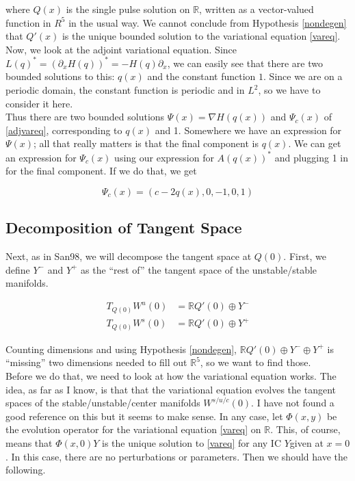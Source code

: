 \documentclass[12pt]{article}
\def\R{{\mathbb R}}
\begin{document}
where $Q(x)$ is the single pulse solution on $\R$, written as a vector-valued function in $R^5$ in the usual way. We cannot conclude from Hypothesis \ref{nondegen} that $Q'(x)$ is the unique bounded solution to the variational equation \eqref{vareq}.\\

Now, we look at the adjoint variational equation. Since $L(q)^* = (\partial_x H(q))^* = -H(q) \partial_x$, we can easily see that there are two bounded solutions to this: $q(x)$ and the constant function $1$. Since we are on a periodic domain, the constant function is periodic and in $L^2$, so we have to consider it here.\\

Thus there are two bounded solutions $\Psi(x) = \nabla H(q(x))$ and $\Psi_c(x)$ of \eqref{adjvareq}, corresponding to $q(x)$ and 1. Somewhere we have an expression for $\Psi(x)$; all that really matters is that the final component is $q(x)$. We can get an expression for $\Psi_c(x)$ using our expression for $A(q(x))^*$ and plugging 1 in for the final component. If we do that, we get

\[
\Psi_c(x) = (c - 2 q(x), 0, -1, 0, 1)
\]

\subsection{Decomposition of Tangent Space}

Next, as in San98, we will decompose the tangent space at $Q(0)$. First, we define $Y^-$ and $Y^+$ as the ``rest of'' the tangent space of the unstable/stable manifolds.

\begin{align*}
T_{Q(0)} W^u(0) &= \R Q'(0) \oplus Y^- \\
T_{Q(0)} W^s(0) &= \R Q'(0) \oplus Y^+
\end{align*}

Counting dimensions and using Hypothesis \ref{nondegen}, $\R Q'(0) \oplus Y^- \oplus Y^+$ is ``missing'' two dimensions needed to fill out $\R^5$, so we want to find those.\\

Before we do that, we need to look at how the variational equation works. The idea, as far as I know, is that that the variational equation evolves the tangent spaces of the stable/unstable/center manifolds $W^{s/u/c}(0)$. I have not found a good reference on this but it seems to make sense. In any case, let $\Phi(x, y)$ be the evolution operator for the variational equation \eqref{vareq} on $\R$. This, of course, means that $\Phi(x, 0)Y$ is the unique solution to \eqref{vareq} for any IC $Y$given at $x = 0$. In this case, there are no perturbations or parameters. Then we should have the following.
\end{document}
